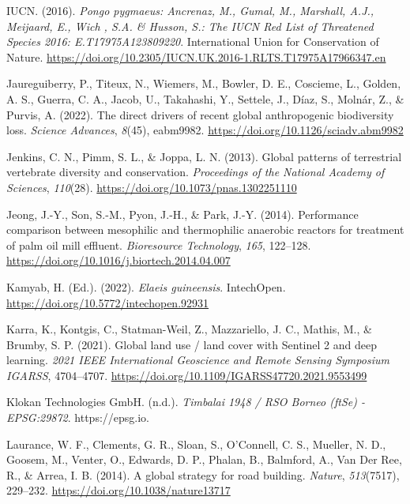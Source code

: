 \documentclass[
  letterpaper,
  DIV=11,
  numbers=noendperiod]{scrreprt}
\newlength{\cslhangindent}
\newlength{\cslentryspacingunit} %
\newenvironment{CSLReferences}[2] %
 {%
  \setlength{\parindent}{0pt}
  \ifodd #1
  \let\oldpar\par
  \def\par{\hangindent=\cslhangindent\oldpar}
  \fi
  \setlength{\parskip}{#2\cslentryspacingunit}
 }%
 {}
\begin{document}
\begin{CSLReferences}{1}{0}
\leavevmode{}%
IUCN. (2016). \emph{Pongo pygmaeus: {Ancrenaz}, {M}., {Gumal}, {M}.,
{Marshall}, {A}.{J}., {Meijaard}, {E}., {Wich} , {S}.{A}. \& {Husson},
{S}.: {The IUCN Red List} of {Threatened Species} 2016:
E.{T17975A123809220}}. {International Union for Conservation of Nature}.
\url{https://doi.org/10.2305/IUCN.UK.2016-1.RLTS.T17975A17966347.en}

\leavevmode{}%
Jaureguiberry, P., Titeux, N., Wiemers, M., Bowler, D. E., Coscieme, L.,
Golden, A. S., Guerra, C. A., Jacob, U., Takahashi, Y., Settele, J.,
Díaz, S., Molnár, Z., \& Purvis, A. (2022). The direct drivers of recent
global anthropogenic biodiversity loss. \emph{Science Advances},
\emph{8}(45), eabm9982. \url{https://doi.org/10.1126/sciadv.abm9982}

\leavevmode{}%
Jenkins, C. N., Pimm, S. L., \& Joppa, L. N. (2013). Global patterns of
terrestrial vertebrate diversity and conservation. \emph{Proceedings of
the National Academy of Sciences}, \emph{110}(28).
\url{https://doi.org/10.1073/pnas.1302251110}

\leavevmode{}%
Jeong, J.-Y., Son, S.-M., Pyon, J.-H., \& Park, J.-Y. (2014).
Performance comparison between mesophilic and thermophilic anaerobic
reactors for treatment of palm oil mill effluent. \emph{Bioresource
Technology}, \emph{165}, 122--128.
\url{https://doi.org/10.1016/j.biortech.2014.04.007}

\leavevmode{}%
Kamyab, H. (Ed.). (2022). \emph{Elaeis guineensis}. {IntechOpen}.
\url{https://doi.org/10.5772/intechopen.92931}

\leavevmode{}%
Karra, K., Kontgis, C., Statman-Weil, Z., Mazzariello, J. C., Mathis,
M., \& Brumby, S. P. (2021). Global land use / land cover with
{Sentinel} 2 and deep learning. \emph{2021 {IEEE International
Geoscience} and {Remote Sensing Symposium IGARSS}}, 4704--4707.
\url{https://doi.org/10.1109/IGARSS47720.2021.9553499}

\leavevmode{}%
Klokan Technologies GmbH. (n.d.). \emph{Timbalai 1948 / {RSO Borneo}
({ftSe}) - {EPSG}:29872}. https://epsg.io.

\leavevmode{}%
Laurance, W. F., Clements, G. R., Sloan, S., O'Connell, C. S., Mueller,
N. D., Goosem, M., Venter, O., Edwards, D. P., Phalan, B., Balmford, A.,
Van Der Ree, R., \& Arrea, I. B. (2014). A global strategy for road
building. \emph{Nature}, \emph{513}(7517), 229--232.
\url{https://doi.org/10.1038/nature13717}


\end{CSLReferences}
\end{document}

